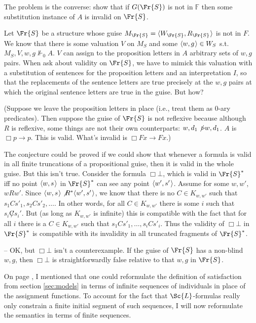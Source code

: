 \documentclass[11pt]{woarticle}
\theoremstyle{break}
\theoremstyle{nonumberplain}
\newcommand{\SAT}{\Vdash}
\newcommand{\Img}{\triangleright}
\newcommand{\1}{\;\,|\;\,}
\renewcommand{\t}[1]{\ensuremath{\langle #1  \makebox[.2ex]{}\rangle}}
\begin{document}
{  The problem is the converse: show that if $G(\Fr{S})$ is not in $\mathbb{F}$
  then some substitution instance of $A$ is invalid on $\Fr{S}$.

  Let $\Fr{S}$ be a structure whose guise
  $M_{\Fr{S}} = \t{W_{\Fr{S}},R_{\Fr{S}}}$ is not in $F$. We know that there is
  some valuation $V$ on $M_{S}$ and some $\t{w,g} \in W_{S}$ s.t.
  $M_S,V,w,g \not\SAT_{0} A$. $V$ can assign to the proposition letters in $A$
  arbitrary sets of $w,g$ pairs. When ask about validity on $\Fr{S}$, we have to
  mimick this valuation with a substitution of sentences for the proposition
  letters and an interpretation $I$, so that the replacements of the sentence
  letters are true precisely at the $w,g$ pairs at which the original sentence
  letters are true in the guise. But how?

  (Suppose we leave the proposition letters in place (i.e., treat them as 0-ary
  predicates). Then suppose the guise of $\Fr{S}$ is not reflexive because
  although $R$ is reflexive, some things are not their own counterparts:
  $w,d_{1}\not\Img w,d_{1}$. $A$ is $\Box p \to p$. This is valid. What's
  invalid is $\Box Fx \to Fx$.)

  The conjecture could be proved if we could show that whenever a formula is
  valid in all finite truncations of a propositional guise, then it is valid in
  the whole guise. But this isn't true. Consider the formula $\Box \bot$, which
  is valid in $\Fr{S}^*$ iff no point $\t{w,s}$ in $\Fr{S}^*$ can see any point
  $\t{w',s'}$. Assume for some $w,w'$, $wRw'$. Since $\t{w,s}\not R^*\t{w',s'}$,
  we know that there is no $C \in K_{w,w'}$ such that
  $s_1 C s'_1, s_2 C s'_2, \ldots$. In other words, for all $C\in K_{w,w'}$
  there is some $i$ such that $s_i \not C s_i'$. But (as long as $K_{w,w'}$ is
  infinite) this is compatible with the fact that for all $i$ there is a
  $C \in K_{w,w'}$ such that $s_1 C s'_1,\ldots,s_i C s'_i$. Thus the validity
  of $\Box \bot$ in $\Fr{S}^*$ is compatible with its invalidity in all
  truncated fragments of $\Fr{S}^*$.

  -- OK, but $\Box \bot$ isn't a counterexample. If the guise of $\Fr{S}$ has a
  non-blind $w,g$, then $\Box \bot$ is straightforwardly false relative to that
  $w,g$ in $\Fr{S}$.

} %

On page \pageref{p:tarski-semantics}, I mentioned that one could reformulate the
definition of satisfaction from section \ref{sec:models} in terms of infinite
sequences of individuals in place of the assignment functions. To account for
the fact that $\Sc{L}$-formulas really only constrain a finite initial segment
of such sequences, I will now reformulate the semantics in terms of finite
sequences.
\end{document}
